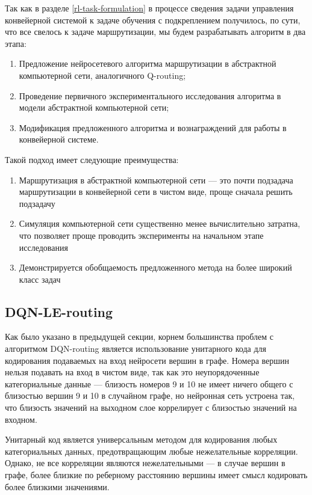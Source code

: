 \documentclass[specification,annotation,times]{itmo-student-thesis}
\theoremstyle{definition}
\begin{document}
Так как в разделе \ref{rl-task-formulation} в процессе сведения задачи
управления конвейерной системой к задаче обучения с подкреплением получилось, по
сути, что все свелось к задаче маршрутизации, мы будем разрабатывать алгоритм в
два этапа:

\begin{enumerate}
\item Предложение нейросетевого алгоритма маршрутизации в абстрактной
  компьютерной сети, аналогичного Q-routing;
\item Проведение первичного экспериментального исследования алгоритма в модели
  абстрактной компьютерной сети;
\item Модификация предложенного алгоритма и вознаграждений для работы в
  конвейерной системе.
\end{enumerate}

Такой подход имеет следующие преимущества:

\begin{enumerate}
\item Маршрутизация в абстрактной компьютерной сети --- это почти подзадача
  маршрутизации в конвейерной сети в чистом виде, проще сначала решить подзадачу
\item Симуляция компьютерной сети существенно менее вычислительно затратна, что
  позволяет проще проводить эксперименты на начальном этапе исследования
\item Демонстрируется обобщаемость предложенного метода на более широкий класс
  задач
\end{enumerate}

\subsection{DQN-LE-routing}

Как было указано в предыдущей секции, корнем большинства проблем с алгоритмом
DQN-routing является использование унитарного кода для кодирования подаваемых на
вход нейросети вершин в графе. Номера вершин нельзя подавать на вход в чистом
виде, так как это неупорядоченные категориальные данные --- близость номеров 9 и
10 не имеет ничего общего с близостью вершин 9 и 10 в случайном графе, но
нейронная сеть устроена так, что близость значений на выходном слое коррелирует
с близостью значений на входном.

Унитарный код является универсальным методом для кодирования любых
категориальных данных, предотвращающим любые нежелательные корреляции. Однако,
не все корреляции являются нежелательными --- в случае вершин в графе, более близкие
по реберному расстоянию вершины имеет смысл кодировать более близкими
значениями.
\end{document}
